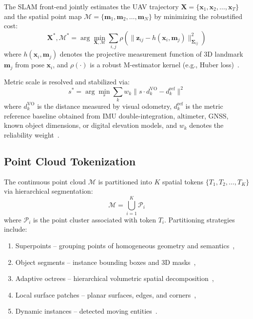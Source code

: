 The SLAM front-end jointly estimates the UAV trajectory $\mathbf{X} = \{\mathbf{x}_1, \mathbf{x}_2, \dots, \mathbf{x}_T\}$ and the spatial point map $\mathcal{M} = \{\mathbf{m}_1, \mathbf{m}_2, \dots, \mathbf{m}_N\}$ by minimizing the robustified cost:
\begin{equation}
  \mathbf{X}^*, \mathcal{M}^* = \arg\min_{\mathbf{X}, \mathcal{M}} \sum_{i,j} \rho\left( \| \mathbf{z}_{ij} - h(\mathbf{x}_i, \mathbf{m}_j) \|_{\mathbf{\Sigma}_{ij}}^2 \right)
\end{equation}
where $h(\mathbf{x}_i, \mathbf{m}_j)$ denotes the projective measurement function of 3D landmark $\mathbf{m}_j$ from pose $\mathbf{x}_i$, and $\rho(\cdot)$ is a robust M-estimator kernel (e.g., Huber loss)~\cite{liu2024slideslam, liu2022largescale}.

Metric scale is resolved and stabilized via:
\begin{equation}
  s^* = \arg\min_s \sum_k w_k \| s \cdot d_k^{\text{VO}} - d_k^{\text{ref}} \|^2
\end{equation}
where $d_k^{\text{VO}}$ is the distance measured by visual odometry, $d_k^{\text{ref}}$ is the metric reference baseline obtained from IMU double-integration, altimeter, GNSS, known object dimensions, or digital elevation models, and $w_k$ denotes the reliability weight~\cite{pomianek2026s4dtam, liu2022largescale}.

\subsection{Point Cloud Tokenization}
\label{subsec:tokenization}

The continuous point cloud $\mathcal{M}$ is partitioned into $K$ spatial tokens $\{T_1, T_2, \dots, T_K\}$ via hierarchical segmentation:
\begin{equation}
  \mathcal{M} = \bigcup_{i=1}^K \mathcal{P}_i
\end{equation}
where $\mathcal{P}_i$ is the point cluster associated with token $T_i$. Partitioning strategies include:
\begin{enumerate}
  \item Superpoints -- grouping points of homogeneous geometry and semantics~\cite{zhang2021you, he2024efficient},
  \item Object segments -- instance bounding boxes and 3D masks~\cite{li2024hislam, haghighi2024ovoslam},
  \item Adaptive octrees -- hierarchical volumetric spatial decomposition~\cite{tian2024same, xiang2021customizable},
  \item Local surface patches -- planar surfaces, edges, and corners~\cite{liu2022largescale},
  \item Dynamic instances -- detected moving entities~\cite{zheng2024gaussianad, wang2024occsora}.
\end{enumerate}


